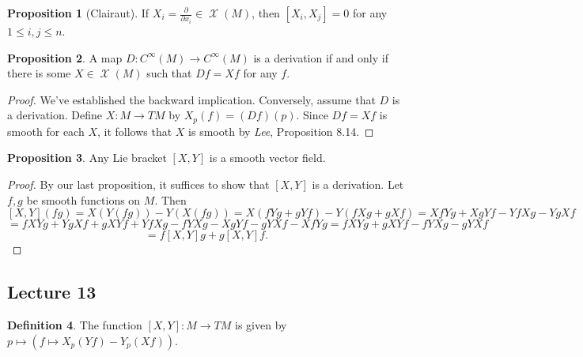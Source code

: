 \documentclass[10pt,letterpaper,cm]{nupset}
\theoremstyle{definition}
\newtheorem{definition}{Definition}[subsection]
\theoremstyle{theorem}
\newtheorem{prop}[definition]{Proposition}
\theoremstyle{remark}
\newcommand{\1}{\mathbf{1}}
\newcommand{\0}{\vec 0}
\DeclareMathOperator{\vf}{\mathscr{X}}
\begin{document}
\begin{prop}[Clairaut]
If $X_i = \frac{\partial}{\partial{x_i}}\in \vf(M)$, then $[X_i, X_j] = 0$ for any $1\leq i,j \leq n$.
\end{prop}

\begin{prop}
A map $D: C^{\infty}(M) \to C^{\infty}(M)$ is a derivation if and only if there is some $X \in \vf(M)$ such that $Df = Xf$ for any $f$.
\end{prop}
\begin{proof}
We've established the backward implication. Conversely, assume that $D$ is a derivation. Define $X : M \to TM$ by $X_p(f) = (Df)(p)$. Since $Df = Xf$ is smooth for each $X$, it follows that $X$ is smooth by \textit{Lee}, Proposition 8.14.
\end{proof}

\begin{prop}
Any Lie bracket $[X, Y]$ is a smooth vector field.
\end{prop}
\begin{proof}
By our last proposition, it suffices to show that $[X, Y]$ is a derivation. Let $f, g$ be smooth functions on $M$. Then
$$  [X, Y](fg) = X(Y(fg)) - Y(X(fg)) =  X(fYg + gYf) - Y(fXg + gXf) = XfYg + XgYf - YfXg - YgXf$$ $$= fXYg + YgXf + gXYf + YfXg - fYXg - XgYf - gYXf - XfYg = fXYg + gXYf - fYXg - gYXf$$ $$= f[X,Y]g + g[X,Y]f
.$$
\end{proof}

\subsection{Lecture 13}

\begin{definition}
The function $[X, Y] : M \to TM$ is given by $p\mapsto (f \mapsto X_p(Yf) - Y_p(Xf))$.
\end{definition}
\end{document}

